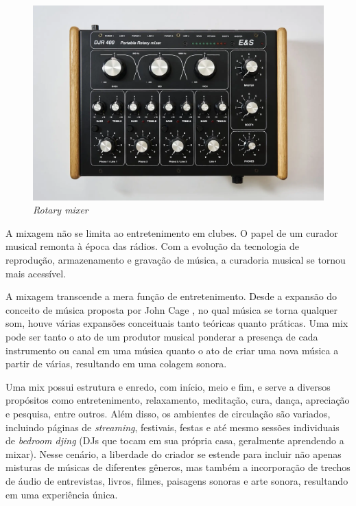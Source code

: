 \begin{figure}[h]
	\centering
    \includegraphics[scale=0.2]{figuras/fig18.png}
	\caption{\textit{Rotary mixer} \cite{electroniquespectacleampAUDIO}}
	\label{fig18}
\end{figure}

A mixagem não se limita ao entretenimento em clubes. O papel de um curador musical remonta à época das rádios. Com a evolução da tecnologia de reprodução, armazenamento e gravação de música, a curadoria musical se tornou mais acessível.

A mixagem transcende a mera função de entretenimento. Desde a expansão do conceito de música proposta por John Cage \cite{cage}, no qual música se torna qualquer som, houve várias expansões conceituais tanto teóricas quanto práticas. Uma mix pode ser tanto o ato de um produtor musical ponderar a presença de cada instrumento ou canal em uma música quanto o ato de criar uma nova música a partir de várias, resultando em uma colagem sonora.

Uma mix possui estrutura e enredo, com início, meio e fim, e serve a diversos propósitos como entretenimento, relaxamento, meditação, cura, dança, apreciação e pesquisa, entre outros. Além disso, os ambientes de circulação são variados, incluindo páginas de \textit{streaming}, festivais, festas e até mesmo sessões individuais de \textit{bedroom djing} (DJs que tocam em sua própria casa, geralmente aprendendo a mixar). Nesse cenário, a liberdade do criador se estende para incluir não apenas misturas de músicas de diferentes gêneros, mas também a incorporação de trechos de áudio de entrevistas, livros, filmes, paisagens sonoras e arte sonora, resultando em uma experiência única.

